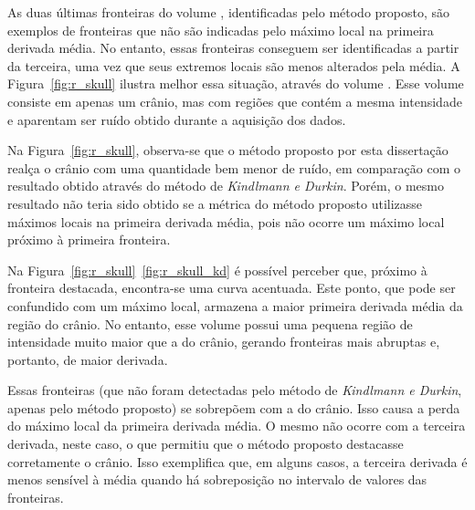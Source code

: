 	As duas últimas fronteiras do volume , identificadas pelo método proposto, são exemplos de fronteiras que não são indicadas pelo máximo local na primeira derivada média. No entanto, essas fronteiras conseguem ser identificadas a partir da terceira, uma vez que seus extremos locais são menos alterados pela média.	A Figura~\ref{fig:r_skull} ilustra melhor essa situação, através do volume . Esse volume consiste em apenas um crânio, mas com regiões que contém a mesma intensidade e aparentam ser ruído obtido durante a aquisição dos dados.
	
	Na Figura~\ref{fig:r_skull}, observa-se que o método proposto por esta dissertação realça o crânio com uma quantidade bem menor de ruído, em comparação com o resultado obtido através do método de \textit{Kindlmann e Durkin}. Porém, o mesmo resultado não teria sido obtido se a métrica do método proposto utilizasse máximos locais na primeira derivada média, pois não ocorre um máximo local próximo à primeira fronteira.
	
	Na Figura~\ref{fig:r_skull}~\ref{fig:r_skull_kd} é possível perceber que, próximo à fronteira destacada, encontra-se uma curva acentuada. Este ponto, que pode ser confundido com um máximo local, armazena a maior primeira derivada média da região do crânio. No entanto, esse volume possui uma pequena região de intensidade muito maior que a do crânio, gerando fronteiras mais abruptas e, portanto, de maior derivada.
	
	Essas fronteiras (que não foram detectadas pelo método de \textit{Kindlmann e Durkin}, apenas pelo método proposto) se sobrepõem com a do crânio. Isso causa a perda do máximo local da primeira derivada média. O mesmo não ocorre com a terceira derivada, neste caso, o que permitiu que o método proposto destacasse corretamente o crânio. Isso exemplifica que, em alguns casos, a terceira derivada é menos sensível à média quando há sobreposição no intervalo de valores das fronteiras.
	
